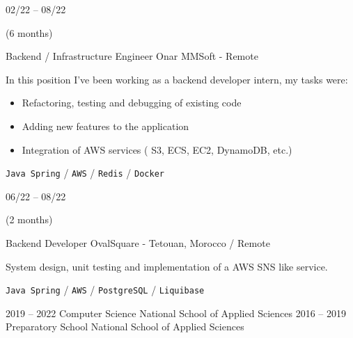 \documentclass[10pt]{developercv} %
\begin{document}
\begin{entrylist}
	\entry
		{02/22 -- 08/22

            (6 months)}
		{Backend / Infrastructure Engineer}
		{Onar MMSoft - Remote}
	    {In this position I've been working as a backend developer intern,
	        my tasks were:

            \begin{itemize}
                \item Refactoring, testing and debugging of existing code
                \item Adding new features to the application
                \item Integration of AWS services ( S3, ECS, EC2, DynamoDB, etc.)
            \end{itemize}

            \texttt{Java Spring} /
            \texttt{AWS} /
            \texttt{Redis} /
            \texttt{Docker}
        }
	\entry
		{06/22 -- 08/22
		    
		    (2 months)}
		{Backend Developer}
		{OvalSquare - Tetouan, Morocco / Remote}
		{System design, unit testing and implementation of a AWS SNS like service.

            \texttt {Java Spring} /
            \texttt {AWS} /
            \texttt {PostgreSQL} /
            \texttt {Liquibase}
		}
\end{entrylist}



\begin{entrylist}
	\entry
		{2019 -- 2022}
		{Computer Science}
		{National School of Applied Sciences}
        {}
	\entry
		{2016 -- 2019}
		{Preparatory School}
		{National School of Applied Sciences}
        {}
\end{entrylist}



\end{document}
